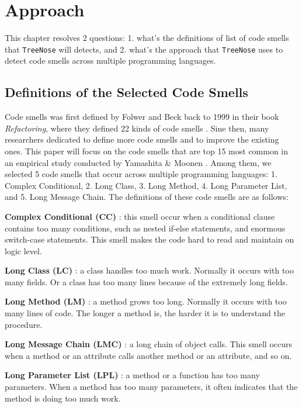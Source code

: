 \section{Approach}
\label{sec:approach}

This chapter resolves 2 questions: 1. what's the definitions of list of code smells that \texttt{TreeNose} will detects, 
and 2. what's the approach that \texttt{TreeNose} uses to detect code smells across multiple programming languages.


\subsection{Definitions of the Selected Code Smells}
\label{sec:Definitions of the Selected Code Smells}

Code smells was first defined by Folwer and Beck back to 1999 in their book \textit{Refactoring}, 
where they defined 22 kinds of code smells \cite{Fowler_Beck}. Sine then, many researchers dedicated to define more 
code smells and to improve the existing ones. This paper will focus on the code smells that are top 15 most common in 
an empirical study conducted by Yamashita \& Moonen \cite{developersCare}.
Among them, we selected 5 code smells that occur across multiple programming languages: 1. Complex Conditional, 2. Long Class,
3. Long Method, 4. Long Parameter List, and 5. Long Message Chain. The definitions of these code smells are as follows:

\textbf{Complex Conditional (CC)} \cite{Fowler_Beck}: this smell occur when a conditional clause contains too many conditions, 
such as nested if-else statements, and enormous switch-case statements. This smell makes the code hard to read and maintain on logic level.

\textbf{Long Class (LC)} \cite{Fowler_Beck}: a class handles too much work. Normally it occurs with too many fields. Or a class has too many lines because of 
the extremely long fields. 

\textbf{Long Method (LM)} \cite{Fowler_Beck}: a method grows too long. Normally it occurs with too many lines of code. The longer a method is, the harder it is to understand the procedure.

\textbf{Long Message Chain (LMC)} \cite{Fowler_Beck}: a long chain of object calls. This smell occurs when a method or an attribute calls another method or an attribute, and so on.

\textbf{Long Parameter List (LPL)} \cite{Fowler_Beck}: a method or a function has too many parameters. When a method has too many parameters, it often indicates that the method is doing too much work.

